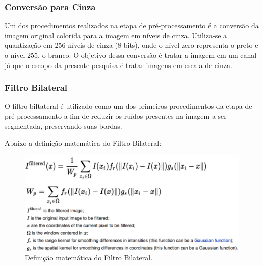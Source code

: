\subsubsection{Conversão para Cinza}
Um dos procedimentos realizados na etapa de pré-processamento é a conversão da imagem original colorida para a imagem em níveis de cinza. Utiliza-se a quantização em 256 níveis de cinza (8 bits), onde o nível zero representa o preto e o nível 255, o branco.
O objetivo dessa conversão é tratar a imagem em um canal já que o escopo da presente pesquisa é tratar imagens em escala de cinza.

\subsubsection{Filtro Bilateral}
O filtro biltateral é utilizado como um dos primeiros procedimentos da etapa de pré-processamento a fim de reduzir os ruídos presentes na imagem a ser segmentada, preservando suas bordas.

Abaixo a definição matemática do Filtro Bilateral:

	\begin{figure}[!htb]
       \begin{center}  
          \includegraphics[width=0.8\columnwidth]{img/definicao_matematica_filtro_bilateral.jpg}
           \caption{\label{fig:definicao_matematica_filtro_bilateral}Definição matemática do Filtro Bilateral. \citep{Banterle2012}}
       \end{center}
   \end{figure}
	\clearpage
